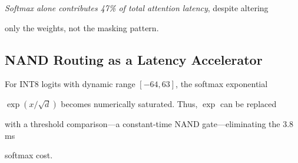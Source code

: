 \emph{Softmax alone contributes 47\% of total attention latency}, despite altering





only the weights, not the masking pattern.











\subsection{NAND Routing as a Latency Accelerator}











\begin{lemma}





For INT8 logits with dynamic range $[-64, 63]$, the softmax exponential





$\exp(x / \sqrt{d})$ becomes numerically saturated. Thus, $\exp$ can be replaced





with a threshold comparison---a constant-time NAND gate---eliminating the 3.8 ms





softmax cost.





\end{lemma}











